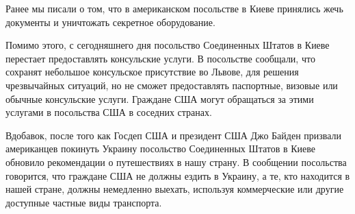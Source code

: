Ранее мы писали о том, что в американском посольстве в Киеве принялись жечь
документы и уничтожать секретное оборудование.

Помимо этого, с сегодняшнего дня посольство Соединенных Штатов в Киеве
перестает предоставлять консульские услуги. В посольстве сообщали, что сохранят
небольшое консульское присутствие во Львове, для решения чрезвычайных ситуаций,
но не сможет предоставлять паспортные, визовые или обычные консульские услуги.
Граждане США могут обращаться за этими услугами в посольства США в соседних
странах. 

Вдобавок, после того как Госдеп США и президент США Джо Байден призвали
американцев покинуть Украину посольство Соединенных Штатов в Киеве обновило
рекомендации о путешествиях в нашу страну. В сообщении посольства говорится,
что граждане США не должны ездить в Украину, а те, кто находится в нашей
стране, должны немедленно выехать, используя коммерческие или другие доступные
частные виды транспорта.
